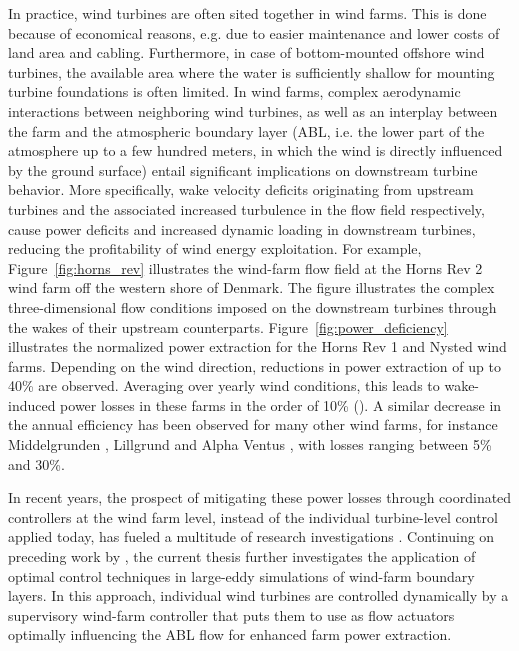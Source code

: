 In practice, wind turbines are often sited together in wind farms. This is done because of economical reasons, e.g. due to easier maintenance and lower costs of land area and cabling. Furthermore, in case of bottom-mounted offshore wind turbines, the available area where the water is sufficiently shallow for mounting turbine foundations is often limited. In wind farms, complex aerodynamic interactions between neighboring wind turbines, as well as an interplay between the farm and the atmospheric boundary layer (ABL, i.e. the lower part of the atmosphere up to a few hundred meters, in which the wind is directly influenced by the ground surface) entail significant implications on downstream turbine behavior. More specifically, wake velocity deficits originating from upstream turbines and the associated increased turbulence in the flow field respectively, cause power deficits and increased dynamic loading in downstream turbines, reducing the profitability of wind energy exploitation. For example, Figure~\ref{fig:horns_rev} illustrates the wind-farm flow field at the Horns Rev 2 wind farm off the western shore of Denmark. The figure illustrates the complex three-dimensional flow conditions imposed on the downstream turbines through the wakes of their upstream counterparts. Figure~\ref{fig:power_deficiency} illustrates the normalized power extraction for the Horns Rev 1 and Nysted wind farms. Depending on the wind direction, reductions in power extraction of up to 40\% are observed. Averaging over yearly wind conditions, this leads to wake-induced power losses in these farms in the order of 10\% (\citealt{jensen2005wake, barthelmie2010evaluation,barthelmie2010quantifying}). A similar decrease in the annual efficiency has been observed for many other wind farms, for instance Middelgrunden \citep{barthelmie2007modeling2}, Lillgrund \citep{dahlberg2009assessment} and Alpha Ventus \citep{westerhelweg2014wake},  with losses ranging between 5\% and 30\%.

In recent years, the prospect of mitigating these power losses through coordinated controllers at the wind farm level, instead of the individual turbine-level control applied today, has fueled a multitude of research investigations \citep{knudsen2015survey,boersma2017tutorial}. Continuing on preceding work by \cite{goit2015optimal}, the current thesis further investigates the application of optimal control techniques in large-eddy simulations of wind-farm boundary layers. In this approach, individual wind turbines are controlled dynamically by a supervisory wind-farm controller that puts them to use as flow actuators optimally influencing the ABL flow for enhanced farm power extraction. 

